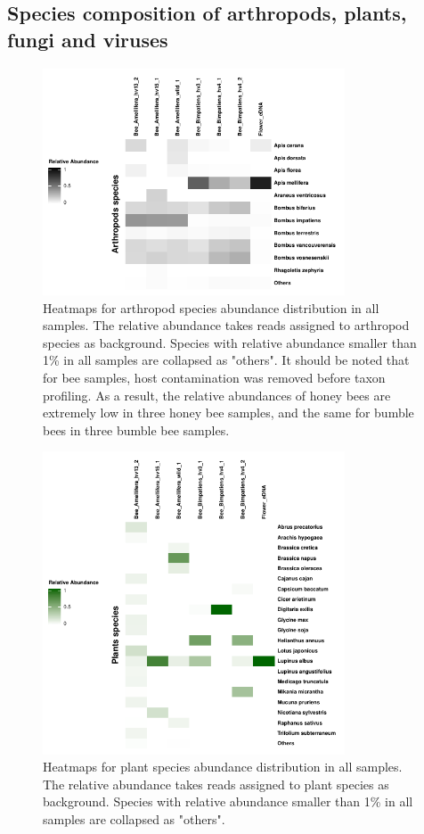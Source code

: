 \documentclass[11pt]{article}
\begin{document}
  \subsection{Species composition of arthropods, plants, fungi and viruses}
  \begin{figure}[H]
    \centering
    \includegraphics[width=0.8\textwidth]{../Figures/RelativeAbundance_0_01_species_Arthropods.pdf}
    \caption{Heatmaps for arthropod species abundance distribution in all samples. 
    The relative abundance takes reads assigned to arthropod species as background. 
    Species with relative abundance smaller than 1\% in all samples are collapsed as "others". 
    It should be noted that for bee samples, host contamination was removed before taxon profiling. 
    As a result, the relative abundances of honey bees are extremely low in three honey bee samples, and the same for bumble bees in three bumble bee samples.}
    \label{ArthropodHeatmap}
    \end{figure}

  \begin{figure}[H]
    \centering
    \includegraphics[width=0.8\textwidth]{../Figures/RelativeAbundance_0_01_species_Plants.pdf}
    \caption{Heatmaps for plant species abundance distribution in all samples. 
    The relative abundance takes reads assigned to plant species as background. 
    Species with relative abundance smaller than 1\% in all samples are collapsed as "others".}
    \label{PlantHeatmap}
    \end{figure}
\end{document}
